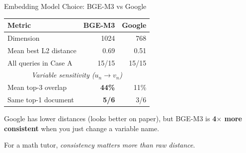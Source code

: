 \documentclass[aspectratio=169, 11pt]{beamer}
\begin{document}
\begin{frame}{Embedding Model Choice: BGE-M3 vs Google}

\begin{center}
\small
\begin{tabular}{lrr}
\toprule
\textbf{Metric} & \textbf{BGE-M3} & \textbf{Google} \\
\midrule
Dimension & 1024 & 768 \\
Mean best L2 distance & 0.69 & 0.51 \\
All queries in Case A & 15/15 & 15/15 \\
\midrule
\multicolumn{3}{c}{\textit{Variable sensitivity ($u_n \to v_n$)}} \\
\midrule
Mean top-3 overlap & \textbf{44\%} & 11\% \\
Same top-1 document & \textbf{5/6} & 3/6 \\
\bottomrule
\end{tabular}
\end{center}

\bigskip

Google has lower distances (looks better on paper), but BGE-M3 is
\textbf{4$\times$ more consistent} when you just change a variable name.

\bigskip

For a math tutor, \textit{consistency matters more than raw distance}.

\end{frame}
\end{document}
